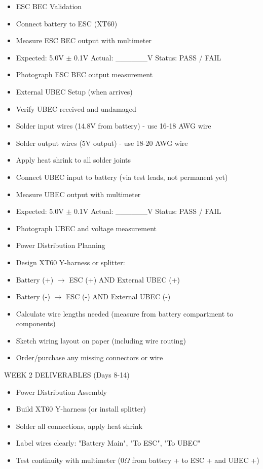 \documentclass[11pt,letterpaper]{article}
\begin{document}
\begin{itemize}
  \item ESC BEC Validation
  \item Connect battery to ESC (XT60)
  \item Measure ESC BEC output with multimeter
  \item Expected: 5.0V $\pm$ 0.1V    Actual: \_\_\_\_\_\_V    Status: PASS / FAIL
  \item Photograph ESC BEC output measurement
\end{itemize}

\begin{itemize}
  \item External UBEC Setup (when arrives)
  \item Verify UBEC received and undamaged
  \item Solder input wires (14.8V from battery) - use 16-18 AWG wire
  \item Solder output wires (5V output) - use 18-20 AWG wire
  \item Apply heat shrink to all solder joints
  \item Connect UBEC input to battery (via test leads, not permanent yet)
  \item Measure UBEC output with multimeter
  \item Expected: 5.0V $\pm$ 0.1V    Actual: \_\_\_\_\_\_V    Status: PASS / FAIL
  \item Photograph UBEC and voltage measurement
\end{itemize}

\begin{itemize}
  \item Power Distribution Planning
  \item Design XT60 Y-harness or splitter:
  \item Battery (+) $\rightarrow$ ESC (+) AND External UBEC (+)
  \item Battery (-) $\rightarrow$ ESC (-) AND External UBEC (-)
  \item Calculate wire lengths needed (measure from battery compartment to components)
  \item Sketch wiring layout on paper (including wire routing)
  \item Order/purchase any missing connectors or wire
\end{itemize}

WEEK 2 DELIVERABLES (Days 8-14)\par

\begin{itemize}
  \item Power Distribution Assembly
  \item Build XT60 Y-harness (or install splitter)
  \item Solder all connections, apply heat shrink
  \item Label wires clearly: "Battery Main", "To ESC", "To UBEC"
  \item Test continuity with multimeter (0$\Omega$ from battery + to ESC + and UBEC +)
\end{itemize}
\end{document}
